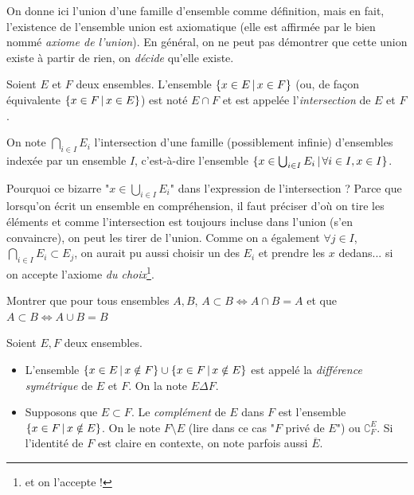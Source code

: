 On donne ici l'union d'une famille d'ensemble comme définition, mais en fait, l'existence de l'ensemble union est axiomatique (elle est affirmée par le bien nommé \emph{axiome de l'union}). En général, on ne peut pas démontrer que cette union existe à partir de rien, on \emph{décide} qu'elle existe.

\begin{dftn}
    Soient $E$ et $F$ deux ensembles. L'ensemble $\{x \in E \,\vert\, x \in F\}$ (ou, de façon équivalente $\{x \in F \,\vert\, x \in E\}$) est noté $E \cap F$ et est appelée l'\emph{intersection} de $E$ et $F$. 
        
    On note $\bigcap_{i \in I} E_i$ l'intersection d'une famille (possiblement infinie) d'ensembles indexée par un ensemble $I$, c'est-à-dire l'ensemble $\{x \in \bigcup_{i\in I}E_i \,\vert\, \forall i \in I, x \in I\}$.
\end{dftn}

Pourquoi ce bizarre "$x \in \bigcup_{i\in I}E_i$" dans l'expression de l'intersection ? Parce que lorsqu'on écrit un ensemble en compréhension, il faut préciser d'où on tire les éléments et comme l'intersection est toujours incluse dans l'union (s'en convaincre), on peut les tirer de l'union. Comme on a également $\forall j \in I$, $\bigcap_{i\in I}E_i \subset E_j$, on aurait pu aussi choisir un des $E_i$ et prendre les $x$ dedans... si on accepte l'axiome \emph{du choix}\footnote{et on l'accepte !}.

\begin{rlined}
    \begin{exo}
        Montrer que pour tous ensembles $A, B$, $A \subset B \Leftrightarrow A \cap B = A$ et que $A \subset B \Leftrightarrow A \cup B = B$
    \end{exo}
\end{rlined}

\begin{dftn}
    Soient $E, F$ deux ensembles.
    \begin{itemize}
        \item L'ensemble $\{x \in E \,\vert\, x \notin F\} \cup \{x \in F \,\vert\, x \notin E\}$ est appelé la \emph{différence symétrique} de $E$ et $F$. On la note $E \Delta F$.
        \item Supposons que $E \subset F$. Le \emph{complément} de $E$ dans $F$ est l'ensemble $\{x \in F \,\vert\, x \notin E\}$. On le note $F \setminus E$ (lire dans ce cas "$F$ privé de $E$") ou $\complement_F^E$. Si l'identité de $F$ est claire en contexte, on note parfois aussi $\overline{E}$.
    \end{itemize}
\end{dftn}

